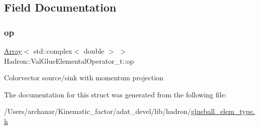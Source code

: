 \subsection{Field Documentation}
\mbox{\label{structHadron_1_1ValGlueElementalOperator__t_ab0bad23294bd9e7f26d0ce2dbdeffef7}} 
\subsubsection{\texorpdfstring{op}{op}}
{\footnotesize\ttfamily \mbox{\hyperlink{classXMLArray_1_1Array}{Array}}$<$ std\+::complex$<$ double $>$ $>$ Hadron\+::\+Val\+Glue\+Elemental\+Operator\+\_\+t\+::op}

Colorvector source/sink with momentum projection 

The documentation for this struct was generated from the following file\+:\begin{DoxyCompactItemize}
\item 
/\+Users/archanar/\+Kinematic\+\_\+factor/adat\+\_\+devel/lib/hadron/\mbox{\hyperlink{lib_2hadron_2glueball__elem__type_8h}{glueball\+\_\+elem\+\_\+type.\+h}}\end{DoxyCompactItemize}
